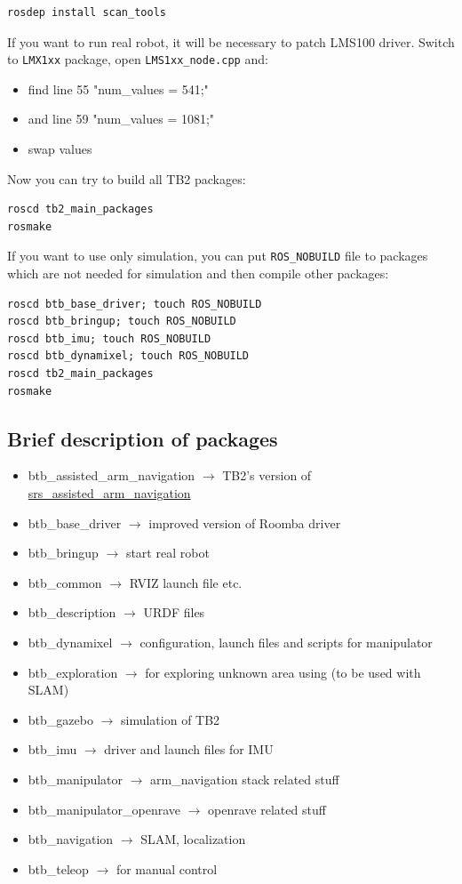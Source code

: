 \documentclass[12pt,a4paper,titlepage]{article}
\numberwithin{equation}{subsection}
\begin{document}
\begin{verbatim}
rosdep install scan_tools
\end{verbatim}

If you want to run real robot, it will be necessary to patch LMS100 driver. Switch to \verb|LMX1xx| package, open \verb|LMS1xx_node.cpp| and:

\begin{itemize}
 \item{find line 55 "num\_values = 541;"}
 \item{and line 59 "num\_values = 1081;"}
 \item{swap values}
\end{itemize}

Now you can try to build all TB2 packages:

\begin{verbatim}
roscd tb2_main_packages
rosmake
\end{verbatim}

If you want to use only simulation, you can put \verb|ROS_NOBUILD| file to packages which are not needed for simulation and then compile other packages:

\begin{verbatim}
roscd btb_base_driver; touch ROS_NOBUILD
roscd btb_bringup; touch ROS_NOBUILD
roscd btb_imu; touch ROS_NOBUILD
roscd btb_dynamixel; touch ROS_NOBUILD
roscd tb2_main_packages
rosmake
\end{verbatim}

\subsection{Brief description of packages}

\begin{itemize}
 \item{btb\_assisted\_arm\_navigation $\rightarrow$ TB2's version of \href{http://ros.org/wiki/srs_assisted_arm_navigation}{srs\_assisted\_arm\_navigation}}
 \item{btb\_base\_driver $\rightarrow$ improved version of Roomba driver}
 \item{btb\_bringup $\rightarrow$ start real robot}
 \item{btb\_common $\rightarrow$ RVIZ launch file etc.}
 \item{btb\_description $\rightarrow$ URDF files}
 \item{btb\_dynamixel $\rightarrow$ configuration, launch files and scripts for manipulator}
 \item{btb\_exploration $\rightarrow$ for exploring unknown area using (to be used with SLAM)}
 \item{btb\_gazebo $\rightarrow$ simulation of TB2}
 \item{btb\_imu $\rightarrow$ driver and launch files for IMU}
 \item{btb\_manipulator $\rightarrow$ arm\_navigation stack related stuff}
 \item{btb\_manipulator\_openrave $\rightarrow$ openrave related stuff}
 \item{btb\_navigation $\rightarrow$ SLAM, localization}
 \item{btb\_teleop $\rightarrow$ for manual control}
\end{itemize}
\end{document}
